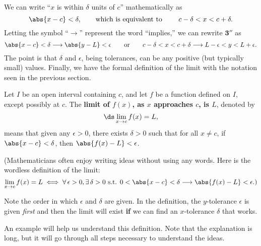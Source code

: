 We can write ``$x$ is within $\delta$ units of $c$'' mathematically as
\[\abs{x-c} < \delta, \qquad \text{which is equivalent to }\qquad c-\delta < x < c+\delta.\]
Letting the symbol ``$\longrightarrow$'' represent the word ``implies,'' we can rewrite $\textbf{3}''$ as 
\[
\abs{x - c} < \delta \longrightarrow  \abs{y - L} < \epsilon 
\qquad \textrm{or} \qquad c - \delta < x < c + \delta \longrightarrow L - \epsilon < y < L + \epsilon.
\]
The point is that $\delta$ and $\epsilon$, being tolerances, can be any positive (but typically small) values.  Finally, we have the formal definition of the limit with the notation  seen in the previous section.

\begin{definition}\label{def:limit}
Let $I$ be an open interval containing $c$, and let $f$ be a function defined on $I$, except possibly at $c$. The \textbf{limit of $f(x)$, as $x$ approaches $c$, is $L$}, denoted by
\[\ds\lim_{x\rightarrow c} f(x) = L,\]
means that given any $\epsilon > 0$, there exists $\delta > 0$ such that for all $x\neq c$,  
if  $\abs{x - c} < \delta$, then $\abs{f(x) - L} < \epsilon$.
\end{definition}

(Mathematicians often enjoy writing ideas without using any words. Here is the wordless definition of the limit:
\[
\lim_{x\to c} f(x) = L \iff
\forall \, \epsilon > 0, \exists \, \delta > 0 \text{ s.t. }
0<\abs{x - c} < \delta \longrightarrow \abs{f(x) - L} < \epsilon\text{.)}
\]

Note the order in which $\epsilon$ and $\delta$ are given.  In the definition, the $y$-tolerance $\epsilon$ is given \emph{first} and then the limit will exist \textbf{if} we can find an $x$-tolerance $\delta$ that works.


An example will help us understand this definition.  Note that the explanation is long, but it will go through all steps necessary to understand the ideas.


